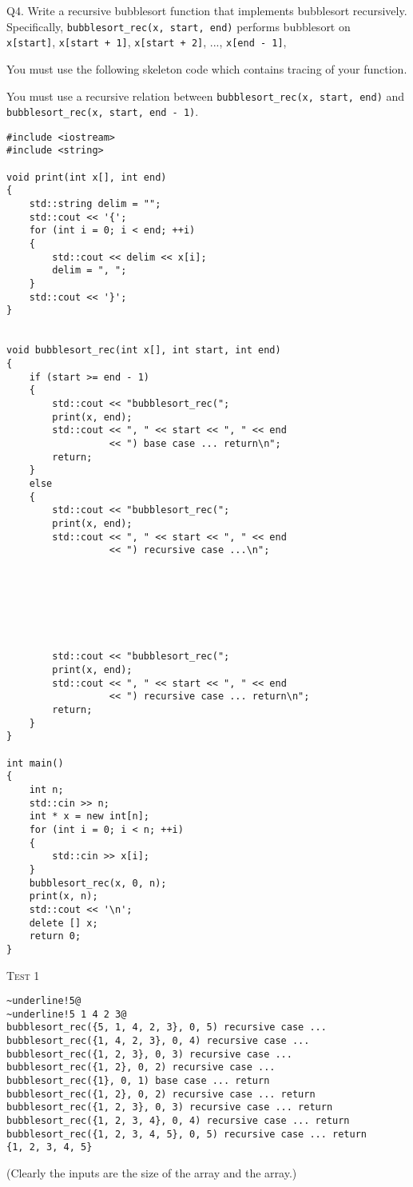 Q4.
Write a recursive bubblesort function that implements
bubblesort recursively.
Specifically, \verb!bubblesort_rec(x, start, end)!
performs bubblesort on
\\
\verb!x[start]!,
\verb!x[start + 1]!,
\verb!x[start + 2]!, ...,
\verb!x[end - 1]!,

You must use the following skeleton code which
contains tracing of your function.

You must use a recursive relation between
\verb!bubblesort_rec(x, start, end)!
and
\\
\verb!bubblesort_rec(x, start, end - 1)!.

\begin{Verbatim}[frame=single, fontsize=\small]
#include <iostream>
#include <string>

void print(int x[], int end)
{
    std::string delim = "";
    std::cout << '{';
    for (int i = 0; i < end; ++i)
    {
        std::cout << delim << x[i];
        delim = ", ";
    }
    std::cout << '}';
}


void bubblesort_rec(int x[], int start, int end)
{
    if (start >= end - 1)
    {
        std::cout << "bubblesort_rec(";
        print(x, end);
        std::cout << ", " << start << ", " << end
                  << ") base case ... return\n";
        return;
    }
    else
    {
        std::cout << "bubblesort_rec(";
        print(x, end);
        std::cout << ", " << start << ", " << end
                  << ") recursive case ...\n";




        


        std::cout << "bubblesort_rec(";
        print(x, end);
        std::cout << ", " << start << ", " << end
                  << ") recursive case ... return\n";
        return;
    }
}

int main()
{
    int n;
    std::cin >> n;
    int * x = new int[n];
    for (int i = 0; i < n; ++i)
    {
        std::cin >> x[i];
    }
    bubblesort_rec(x, 0, n);
    print(x, n);
    std::cout << '\n';
    delete [] x;
    return 0;
}
\end{Verbatim}

\textsc{Test 1}
\begin{Verbatim}[commandchars=\~\!\@, fontsize=\small, frame=single]
~underline!5@
~underline!5 1 4 2 3@
bubblesort_rec({5, 1, 4, 2, 3}, 0, 5) recursive case ...
bubblesort_rec({1, 4, 2, 3}, 0, 4) recursive case ...
bubblesort_rec({1, 2, 3}, 0, 3) recursive case ...
bubblesort_rec({1, 2}, 0, 2) recursive case ...
bubblesort_rec({1}, 0, 1) base case ... return
bubblesort_rec({1, 2}, 0, 2) recursive case ... return
bubblesort_rec({1, 2, 3}, 0, 3) recursive case ... return
bubblesort_rec({1, 2, 3, 4}, 0, 4) recursive case ... return
bubblesort_rec({1, 2, 3, 4, 5}, 0, 5) recursive case ... return
{1, 2, 3, 4, 5}
\end{Verbatim}
(Clearly the inputs are the size of the array and the array.)

